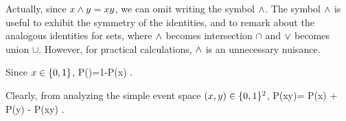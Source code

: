 Actually, since
$x\wedge y=xy$, we can omit writing
the symbol $\wedge$. The symbol
$\wedge$ is useful to
exhibit the symmetry
of the identities, and
to remark
about
the analogous identities
for sets, where
$\wedge$ becomes intersection $\cap$
and $\vee$ becomes union $\cup$. However,
for practical calculations,
$\wedge$ is an unnecessary nuisance.

Since $x\in \{0,1\}$,
\beq
P()=1-P(x)
\;.
\eeq

Clearly, from analyzing
the simple event space $(x,y)\in \{0,1\}^2$,
\beq
P(x\V y)= P(x) + P(y) - P(x\A y)
\;.
\eeq

